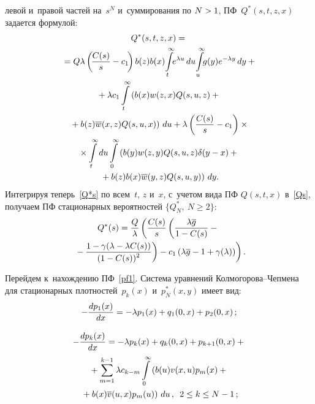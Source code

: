 \begin{multicols}{2}
\noindent
левой и~правой частей на~$s^N$ 
и~суммирования по $N\hm>1$, ПФ~$Q^*(s,t,z,x)$ задается формулой:
\begin{multline}
\label{Q*s}
Q^*(s,t,z,x) ={}\\
{}= Q \lambda \left (\!
\fr{C(s)}{s} - c_1 \!\right ) b(z) b(x) 
\!\int\limits_t^\infty\!\! e^{\lambda u}\, du \!
\int\limits_{u}^\infty \!\!g(y) e^{- \lambda y}\,dy +{}
\\
{}+\lambda c_{1} \int\limits_t^\infty \left (
b(x) w(z,x) Q(s,u,z)+{}\right.\\
\left.{}+ b(z) \overline{w}(x,z) Q(s,u,x) \right )\, du
+ \lambda
\left ( \fr{C(s)}{s} - c_1\right )\times{}\\
{}\times \int\limits_t^\infty du
\int\limits_0^\infty \left (
b(y) w(z,y) Q(s,u,z) \delta(y-x) +{}\right.\\
\left.{}+ b(z) b(x) \overline{w}(y,z) Q(s,u,y)
\right )\,dy.
\end{multline}
Интегрируя теперь~\eqref{Q*s} по всем~$t$, $z$ и~$x$,
с~учетом вида ПФ $Q(s,t,x)$ в~\eqref{Qs}, получаем ПФ 
стационарных вероятностей $\{ Q^*_N, \ N \ge 2 \}$:
\begin{multline}
\label{Q*final}
Q^*(s) = \displaystyle\frac{\displaystyle Q\mathstrut}{\displaystyle \lambda\mathstrut} \left (
\displaystyle\frac{\displaystyle C(s)\mathstrut}{\displaystyle s\mathstrut} \left (  \displaystyle\frac{\displaystyle \lambda \overline{g} \mathstrut}{\displaystyle 1-C(s)\mathstrut} 
- {}\right.\right.\\
\left.\left.{}-\displaystyle\frac{\displaystyle 1-\gamma(\lambda- \lambda C(s))\mathstrut}{\displaystyle (1-C(s))^2 \mathstrut}
\right )
- c_1 \left (
\lambda \overline{g} - 1 + \gamma(\lambda) \right ) \right ). 
\end{multline}

Перейдем к~нахождению ПФ~\eqref{pf1}. Система уравнений 
Кол\-мо\-го\-ро\-ва--Чеп\-ме\-на для стационарных плотностей~$p_k(x)$ 
и~$p^*_N(x,y)$ имеет вид:
\begin{equation}
\label{np1}
-\displaystyle\frac{\displaystyle dp_1(x) \mathstrut}{\displaystyle dx\mathstrut} = -\lambda p_1(x) + q_1(0,x) + p_2(0,x)\,;
\end{equation}

\vspace*{-12pt}

\noindent
\begin{multline}
\label{npk}
-\displaystyle\frac{\displaystyle dp_k(x)\mathstrut}{\displaystyle  dx\mathstrut} = -\lambda p_k(x) + q_k(0,x) + p_{k+1}(0,x)
+{}\\
{}+
\sum\limits_{m=1}^{k-1} \lambda c_{k-m} \int\limits_0^\infty
\left ( b(u) v(x,u) p_m(x) +{}\right.\\
\left.{}+ b(x) \overline{v}(u,x) p_m(u) \right )
\,du\,, \enskip 2 \le k \le N-1\,;
\end{multline}


\end{multicols}

